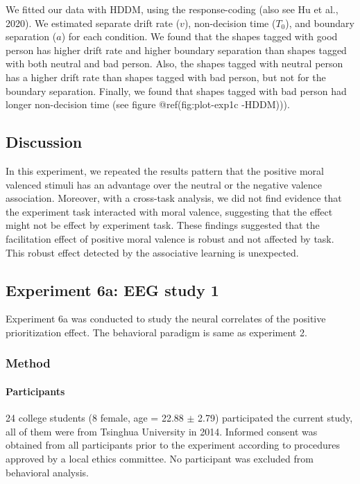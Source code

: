 \documentclass[
  english,
  man]{apa6}
\let\oldparagraph\paragraph
\renewcommand{\paragraph}[1]{\oldparagraph{#1}\mbox{}}
\begin{document}
We fitted our data with HDDM, using the response-coding (also see Hu et al., 2020). We estimated separate drift rate (\(v\)), non-decision time (\(T_{0}\)), and boundary separation (\(a\)) for each condition. We found that the shapes tagged with good person has higher drift rate and higher boundary separation than shapes tagged with both neutral and bad person. Also, the shapes tagged with neutral person has a higher drift rate than shapes tagged with bad person, but not for the boundary separation. Finally, we found that shapes tagged with bad person had longer non-decision time (see figure @ref(fig:plot-exp1c
-HDDM))).

\hypertarget{discussion-1}{%
\subsection{Discussion}\label{discussion-1}}

In this experiment, we repeated the results pattern that the positive moral valenced stimuli has an advantage over the neutral or the negative valence association. Moreover, with a cross-task analysis, we did not find evidence that the experiment task interacted with moral valence, suggesting that the effect might not be effect by experiment task.
These findings suggested that the facilitation effect of positive moral valence is robust and not affected by task. This robust effect detected by the associative learning is unexpected.

\hypertarget{experiment-6a-eeg-study-1}{%
\subsection{Experiment 6a: EEG study 1}\label{experiment-6a-eeg-study-1}}

Experiment 6a was conducted to study the neural correlates of the positive prioritization effect. The behavioral paradigm is same as experiment 2.

\hypertarget{method-3}{%
\subsubsection{Method}\label{method-3}}

\hypertarget{participants-4}{%
\paragraph{Participants}\label{participants-4}}

24 college students (8 female, age = 22.88 \(\pm\) 2.79) participated the current study, all of them were from Tsinghua University in 2014. Informed consent was obtained from all participants prior to the experiment according to procedures approved by a local ethics committee. No participant was excluded from behavioral analysis.
\end{document}
